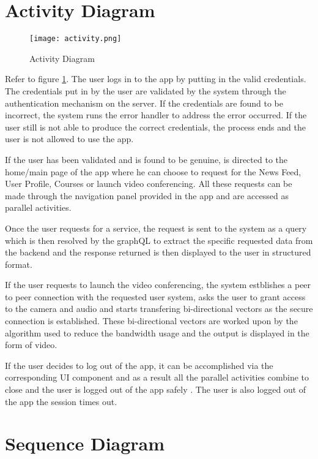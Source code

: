 \section{Activity Diagram}

\begin{figure}[h!]
    \begin{center}
        \texttt{[image: activity.png]}
    \end{center}
    \caption{Activity Diagram}
    \label{fig:activity}
\end{figure}

Refer to figure \ref{fig:activity}. The user logs in to the app by putting in the valid credentials.
The credentials put in by the user are validated by the system through the authentication mechanism on the server.
If the credentials are found to be incorrect, the system runs the error handler to address the error occurred.
If the user still is not able to produce the correct credentials, the process ends and the user is not allowed to use the app.

If the user has been validated and is found to be genuine, is directed to the home/main page of the app where he can choose to request for the News Feed, User Profile, Courses or launch video conferencing.
All these requests can be made through the navigation panel provided in the app and are accessed as parallel activities.

Once the user requests for a service, the request is sent to the system as a query which is then resolved by the graphQL to extract the specific requested data from the backend and the response returned is then displayed to the user in structured format.

If the user requests to launch the video conferencing, the system estblishes a peer to peer connection with the requested user system, asks the user to grant access to the camera and audio and starts transfering bi-directional vectors as the secure connection is established.
These bi-directional vectors are worked upon by the algorithm used to reduce the bandwidth usage and the output is displayed in the form of video.

If the user decides to log out of the app, it can be accomplished via the corresponding UI component and as a result all the parallel activities combine to close and the user is logged out of the app safely .
The user is also logged out of the app the session times out.

\section{Sequence Diagram}

